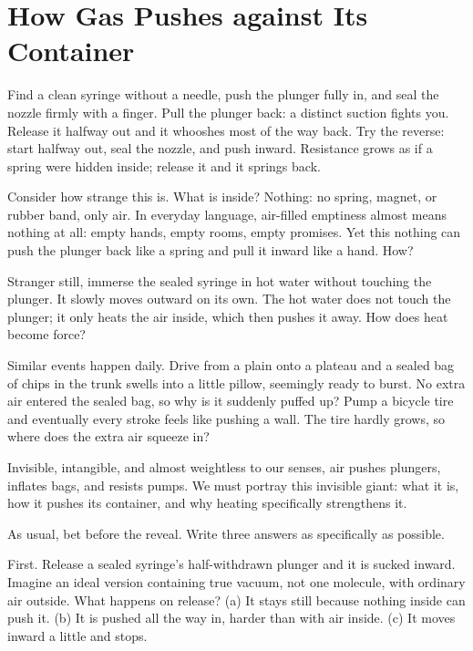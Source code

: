 \chapter{How Gas Pushes against Its Container}


\begin{mainline}
Find a clean syringe without a needle, push the plunger fully in, and seal the nozzle firmly with a finger. Pull the plunger back: a distinct suction fights you. Release it halfway out and it whooshes most of the way back. Try the reverse: start halfway out, seal the nozzle, and push inward. Resistance grows as if a spring were hidden inside; release it and it springs back.

Consider how strange this is. What is inside? Nothing: no spring, magnet, or rubber band, only air. In everyday language, air-filled emptiness almost means nothing at all: empty hands, empty rooms, empty promises. Yet this nothing can push the plunger back like a spring and pull it inward like a hand. How?

Stranger still, immerse the sealed syringe in hot water without touching the plunger. It slowly moves outward on its own. The hot water does not touch the plunger; it only heats the air inside, which then pushes it away. How does heat become force?

Similar events happen daily. Drive from a plain onto a plateau and a sealed bag of chips in the trunk swells into a little pillow, seemingly ready to burst. No extra air entered the sealed bag, so why is it suddenly puffed up? Pump a bicycle tire and eventually every stroke feels like pushing a wall. The tire hardly grows, so where does the extra air squeeze in?

Invisible, intangible, and almost weightless to our senses, air pushes plungers, inflates bags, and resists pumps. We must portray this invisible giant: what it is, how it pushes its container, and why heating specifically strengthens it.
\end{mainline}


As usual, bet before the reveal. Write three answers as specifically as possible.

First. Release a sealed syringe's half-withdrawn plunger and it is sucked inward. Imagine an ideal version containing true vacuum, not one molecule, with ordinary air outside. What happens on release? (a) It stays still because nothing inside can push it. (b) It is pushed all the way in, harder than with air inside. (c) It moves inward a little and stops.

